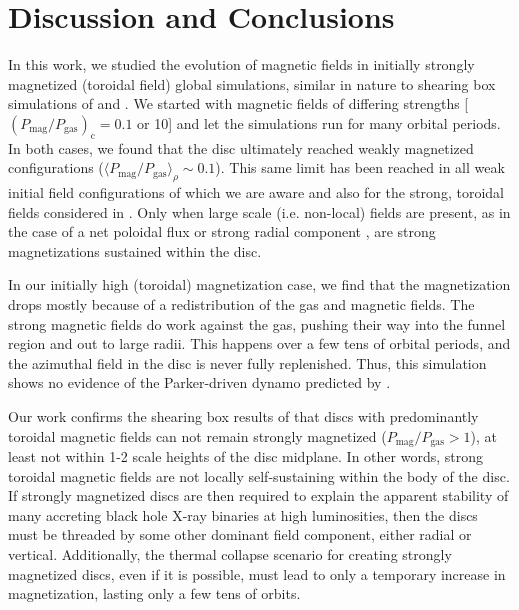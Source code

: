 \documentclass[useAMS,usenatbib]{mn2e}
\def\pmpg{P_\mathrm{mag}/P_\mathrm{gas}}
\begin{document}
\section{Discussion and Conclusions}
\label{s.discuss}

In this work, we studied the evolution of magnetic fields in initially strongly magnetized (toroidal field) global simulations, similar in nature to shearing box simulations of \citet{Johansen08} and \citet{Salvesen16}.  We started with magnetic fields of differing strengths [$(\pmpg)_\mathrm{c} = 0.1$ or 10] and let the simulations run for many orbital periods.  In both cases, we found that the disc ultimately reached weakly magnetized configurations ($\langle \pmpg \rangle_\rho \sim 0.1$).  This same limit has been reached in all weak initial field configurations of which we are aware \citep[see][and references therein]{Hawley11,Hawley13} and also for the strong, toroidal fields considered in \citet{Salvesen16}.  Only when large scale (i.e. non-local) fields are present, as in the case of a net poloidal flux \citep{Bai13,Salvesen16a} or strong radial component \citep{Sadowski16}, are strong magnetizations sustained within the disc.  

In our initially high (toroidal) magnetization case, we find that the magnetization drops mostly because of a redistribution of the gas and magnetic fields.  The strong magnetic fields do work against the gas, pushing their way into the funnel region and out to large radii. This happens over a few tens of orbital periods, and the azimuthal field in the disc is never fully replenished.  Thus, this simulation shows no evidence of the Parker-driven dynamo predicted by \citet{Johansen08}.

Our work confirms the shearing box results of \citet{Salvesen16} that discs with predominantly toroidal magnetic fields can not remain strongly magnetized ($\pmpg > 1$), at least not within 1-2 scale heights of the disc midplane.  In other words, strong toroidal magnetic fields are not locally self-sustaining within the body of the disc.  If strongly magnetized discs are then required to explain the apparent stability of many accreting black hole X-ray binaries at high luminosities, then the discs must be threaded by some other dominant field component, either radial or vertical.  Additionally, the thermal collapse scenario for creating strongly magnetized discs, even if it is possible, must lead to only a temporary increase in magnetization, lasting only a few tens of orbits.
\end{document}
